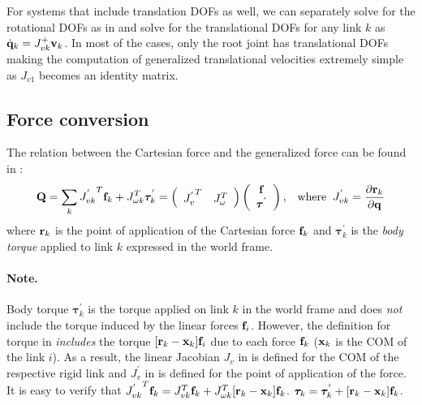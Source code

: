 For systems that include translation DOFs as well, we can separately solve for the rotational DOFs as in  and solve for the translational DOFs for any link $k$ as $\dot{\mathbf{q}}_k = J_{vk}^+\mathbf{v}_k$. In most of the cases, only the root joint has translational DOFs making the computation of generalized translational velocities extremely simple as $J_{v1}$ becomes an identity matrix.


\subsection{Force conversion}
The relation between the Cartesian force and the generalized force can
be found in :
\begin{equation}
\label{eq:force_conversion}
\mathbf{Q} = \sum_k {J^{'}_{vk}}^T \mathbf{f}_k + J_{\omega k}^T \bm{\tau}^{'}_k = 
\left (
\begin{array}{cc}
{J^{'}_{v}}^T & J_\omega^T
\end{array}
\right)
\left(
\begin{array}{c}
\mathbf{f} \\
\bm{\tau}^{'}
\end{array}
\right) 
, \;\;\;\mathrm{where}\;\;
J^{'}_{vk} = \frac{\partial \mathbf{r}_k}{\partial \mathbf{q}}
\end{equation}
where $\mathbf{r}_k$ is the point of application of the Cartesian force
$\mathbf{f}_k$ and $\bm{\tau}^{'}_k$ is the \emph{body torque} applied to link $k$ expressed in the world frame.

\paragraph{Note.} Body torque $\bm{\tau}^{'}_k$ is the torque
applied on link $k$ in the world frame and does \emph{not} include the torque induced by the linear forces $\mathbf{f}_i$. 
However, the definition for torque in  \emph{includes} the torque $[\mathbf{r}_k-\mathbf{x}_k] \mathbf{f}_i$ due to each force $\mathbf{f}_k$ ($\mathbf{x}_k$ is the COM of the link $i$). As a result, the linear Jacobian $J_{v}$ in  is defined for the COM of the respective rigid link and $J^{'}_{v}$ in  is defined for the point of application of the force. It is easy to verify that ${J^{'}_{vk}}^T\mathbf{f}_k = J_{vk}^T\mathbf{f}_k + J_{\omega k}^T[\mathbf{r}_k-\mathbf{x}_k] \mathbf{f}_k$. \ie $\bm{\tau}_k = \bm{\tau}^{'}_k + [\mathbf{r}_k-\mathbf{x}_k] \mathbf{f}_k$.

